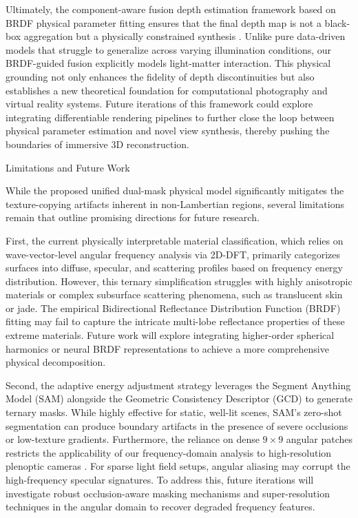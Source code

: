 \documentclass[lettersize,journal]{IEEEtran}
\begin{document}
Ultimately, the component-aware fusion depth estimation framework based on BRDF physical parameter fitting ensures that the final depth map is not a black-box aggregation but a physically constrained synthesis \cite{blinn1977}. Unlike pure data-driven models that struggle to generalize across varying illumination conditions, our BRDF-guided fusion explicitly models light-matter interaction. This physical grounding not only enhances the fidelity of depth discontinuities but also establishes a new theoretical foundation for computational photography and virtual reality systems. Future iterations of this framework could explore integrating differentiable rendering pipelines to further close the loop between physical parameter estimation and novel view synthesis, thereby pushing the boundaries of immersive 3D reconstruction.

Limitations and Future Work

While the proposed unified dual-mask physical model significantly mitigates the texture-copying artifacts inherent in non-Lambertian regions, several limitations remain that outline promising directions for future research. 

First, the current physically interpretable material classification, which relies on wave-vector-level angular frequency analysis via 2D-DFT, primarily categorizes surfaces into diffuse, specular, and scattering profiles based on frequency energy distribution. However, this ternary simplification struggles with highly anisotropic materials or complex subsurface scattering phenomena, such as translucent skin or jade. The empirical Bidirectional Reflectance Distribution Function (BRDF) fitting \cite{blinn1977} may fail to capture the intricate multi-lobe reflectance properties of these extreme materials. Future work will explore integrating higher-order spherical harmonics or neural BRDF representations to achieve a more comprehensive physical decomposition.

Second, the adaptive energy adjustment strategy leverages the Segment Anything Model (SAM) \cite{kirillov2023} alongside the Geometric Consistency Descriptor (GCD) to generate ternary masks. While highly effective for static, well-lit scenes, SAM's zero-shot segmentation can produce boundary artifacts in the presence of severe occlusions or low-texture gradients. Furthermore, the reliance on dense $9 \times 9$ angular patches restricts the applicability of our frequency-domain analysis to high-resolution plenoptic cameras \cite{ng2005}. For sparse light field setups, angular aliasing may corrupt the high-frequency specular signatures. To address this, future iterations will investigate robust occlusion-aware masking mechanisms and super-resolution techniques in the angular domain to recover degraded frequency features.
\end{document}
